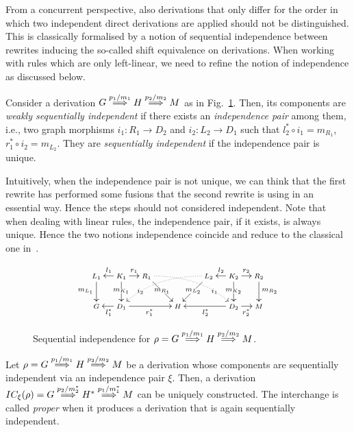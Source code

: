 From a concurrent perspective, also derivations that only differ for
the order in which two independent direct derivations are applied
should not be distinguished. This is classically formalised by a
notion of sequential independence between rewrites inducing the
so-called shift equivalence on derivations. When working with rules
which are only left-linear, we need to refine the notion of
independence as discussed below.


\begin{definition}
  \label{de:seq-ind}
  Consider a derivation $G \stackrel{{p_1/m_1}}{\Longrightarrow} H \stackrel{{p_2/m_2}}{\Longrightarrow} M$ as in
  Fig.~\ref{fi:strongseq}. Then, its components are \emph{weakly sequentially
    independent} if there exists an \emph{independence pair} among
  them, i.e., two graph morphisms $i_1: R_1 \rightarrow D_2$ and
  $i_2: L_2 \rightarrow D_1$ such that $l_2^* \circ i_1 = m_{R_1}$,
  $r_1^* \circ i_2 = m_{L_2}$.
  They are \emph{sequentially
    independent} if the independence pair is unique.
\end{definition}

Intuitively, when the independence pair is not unique, we can think
that the first rewrite has performed some fusions that the second
rewrite is using in an essential way. Hence the steps should not
considered independent.
%
Note that when dealing with linear rules, the independence pair, if it exists,
is always unique. Hence the two notions independence coincide and
reduce to the classical one in~\cite{CMREHL:AAGT}.


\begin{figure}[t]
\[
\def\objectstyle{\scriptstyle}\def\labelstyle{\scriptstyle}
\xymatrix@C=0.7mm@R=7mm{
  {L_1} \ar[d]_{m_{L_1}}
        & & {K_1} \ar[ll]_{l_1} \ar[rr]^{r_1} \ar[d]|{m_{K_1}}
        & & {R_1} \ar[drrr]|{m_{R_1}}  \ar@(r,ul)@{.>}|(.75){i_1}[drrrrrrrr]
        & & & & & &
  {L_2}\ar[dlll]|{m_{L_2}} \ar@(l,ur)@{.>}|(.75){i_2}[dllllllll]
        & & {K_2} \ar[ll]_{l_2} \ar[rr]^{r_2} \ar[d]|{m_{K_2}}
        & & {R_2} \ar[d]^{m_{R_2}} \\
    {G}
     & & {D_1} \ar[ll]^{l^*_1} \ar[rrrrr]_{r^*_1}
     & & & &  & {H} & &
     & & & {D_2} \ar[lllll]^{l^*_2} \ar[rr]_{r^*_2}
     & & {M}  }
\]
\caption{Sequential independence for
  $\rho = G \stackrel{{p_1/m_1}}{\Longrightarrow} H \stackrel{{p_2/m_2}}{\Longrightarrow} M$.}
\label{fi:strongseq}
\end{figure}


\begin{proposition}
  \label{pr:interchangeEG}
  Let $\rho = {G} \stackrel{{p_1/m_1}}{\Longrightarrow} {H} \stackrel{{p_2/m_2}}{\Longrightarrow} {M}$ be a
  derivation whose components are sequentially independent via
  an independence pair $\xi$.
  Then, a derivation $IC_\xi(\rho) = {G} \stackrel{{p_2/m^*_2}}{\Longrightarrow}
  {H^*} \stackrel{{p_1/m^*_1}}{\Longrightarrow} {M}$ can be uniquely constructed.
  The interchange is called \emph{proper} when it produces a
  derivation that is again sequentially independent.
\end{proposition}

